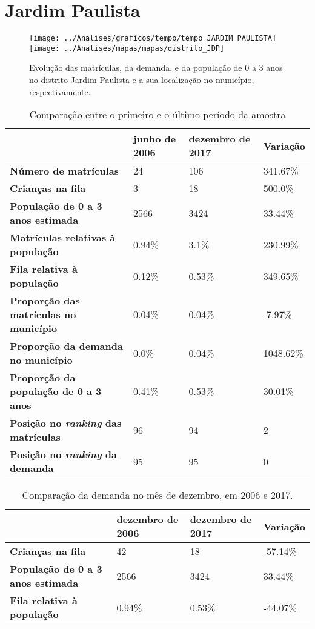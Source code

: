 \section{Jardim Paulista}
\begin{figure}[H]
	\centering
	\texttt{[image: ../Analises/graficos/tempo/tempo\_JARDIM\_PAULISTA]}
	\texttt{[image: ../Analises/mapas/mapas/distrito\_JDP]}
	\caption{Evolução das matrículas, da demanda, e da população de 0 a 3 anos no distrito Jardim Paulista e a sua localização no município, respectivamente.}
\end{figure}
\begin{table}[H]
	\begin{tabular}{|l|l|l|l|}
		\hline
		\textbf{}                                      & \textbf{junho de 2006}       & \textbf{dezembro de 2017}    & \textbf{Variação} \\ \hline
		\textbf{Número de matrículas}                  & 24 & 106 & 341.67\% \\ \hline
		\textbf{Crianças na fila}                      & 3 & 18 & 500.0\% \\ \hline
		\textbf{População de 0 a 3 anos estimada}      & 2566 & 3424 & 33.44\% \\ \hline
		\textbf{Matrículas relativas à população}      & 0.94\% & 3.1\% & 230.99\% \\ \hline
		\textbf{Fila relativa à população}             & 0.12\% & 0.53\% & 349.65\% \\ \hline
		\textbf{Proporção das matrículas no município} & 0.04\% & 0.04\% & -7.97\% \\ \hline
		\textbf{Proporção da demanda no município}     & 0.0\% & 0.04\% & 1048.62\% \\ \hline
		\textbf{Proporção da população de 0 a 3 anos}  & 0.41\% & 0.53\% & 30.01\% \\ \hline
		\textbf{Posição no \textit{ranking} das matrículas}     & 96 & 94 & 2 \\ \hline
		\textbf{Posição no \textit{ranking} da demanda}         & 95 & 95 & 0 \\ \hline
	\end{tabular}
	\caption{Comparação entre o primeiro e o último período da amostra}
\end{table}
\begin{table}[H]
	\begin{tabular}{|l|l|l|l|}
		\hline
		\textbf{}                                 & \textbf{dezembro de 2006} & \textbf{dezembro de 2017} & \textbf{Variação} \\ \hline
		\textbf{Crianças na fila}                      & 42 & 18 & -57.14\% \\ \hline
		\textbf{População de 0 a 3 anos estimada}      & 2566 & 3424 & 33.44\% \\ \hline
		\textbf{Fila relativa à população}             & 0.94\% & 0.53\% & -44.07\% \\ \hline
	\end{tabular}
	\caption{Comparação da demanda no mês de dezembro, em 2006 e 2017.}
\end{table}
